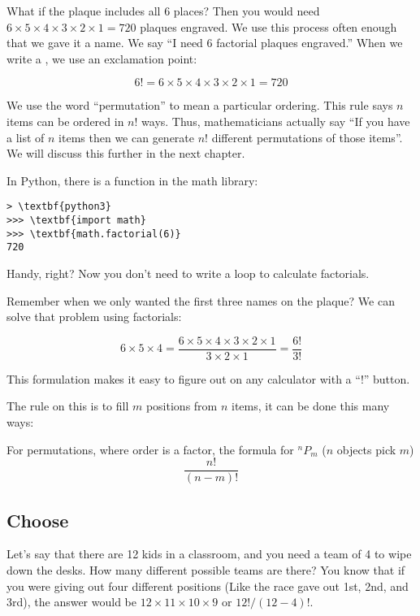 What if the plaque includes all 6 places?  Then you would need $6 \times 5
\times 4 \times 3 \times 2 \times 1 = 720$ plaques engraved.  We use
this process often enough that we gave it a name.  We say ``I need 6
factorial plaques engraved.''  When we write a , we use an
exclamation point:

$$6! = 6 \times 5 \times 4 \times 3 \times 2 \times 1 = 720$$

We use the word ``permutation'' to mean a particular ordering.
This rule says $n$ items can be ordered in $n!$ ways. Thus,
mathematicians actually say ``If you have a list of $n$ items then we
can generate $n!$ different permutations of those items''. We will discuss this further in the next chapter. 

In Python, there is a  function in the math library:
\begin{Verbatim}[commandchars=\\\{\}]
> \textbf{python3} 
>>> \textbf{import math}
>>> \textbf{math.factorial(6)}
720
\end{Verbatim}

Handy, right? Now you don't need to write a loop to calculate factorials.

Remember when we only wanted the first three names on the plaque? We can solve that problem using factorials:

$$6 \times 5 \times 4 = \frac{6 \times 5 \times 4 \times 3 \times 2 \times 1}{3 \times 2 \times 1} = \frac{6!}{3!}$$

This formulation makes it easy to figure out on any calculator with a ``!'' button.

The rule on this is to fill $m$ positions from $n$ items, it can be done this many ways:
\begin{mdframed}[frametitle = {Permutations}, style = important]
For permutations, where order is a factor, the formula for ${}^nP_m$ ($n$ objects pick $m$)
$$\frac{n!}{(n-m)!}$$
\end{mdframed}

\subsection{Choose}

Let's say that there are 12 kids in a classroom, and you need a team
of 4 to wipe down the desks. How many different possible teams are
there? You know that if you were giving out four different positions
(Like the race gave out 1st, 2nd, and 3rd), the answer would be $12\times 11 \times 10 \times 9$ or $12! / (12 - 4)!$.

